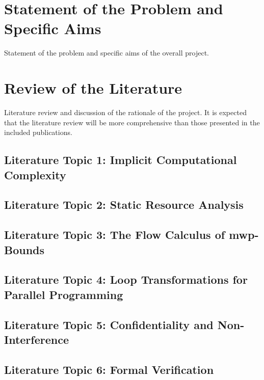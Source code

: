 \clearpage\section{Statement of the Problem and Specific Aims}\label{intro}

Statement of the problem and specific aims of the overall project.



\clearpage\section{Review of the Literature}\label{sec:pre}

Literature review and discussion of the rationale of the project.
It is expected that the literature review will be more comprehensive than
those presented in the included publications.

\subsection{Literature Topic 1: Implicit Computational Complexity}\label{icc}


\subsection{Literature Topic 2: Static Resource Analysis}\label{static-analysis}


\subsection{Literature Topic 3: The Flow Calculus of mwp-Bounds}\label{flow-calculus}


\subsection{Literature Topic 4: Loop Transformations for Parallel Programming}\label{transforms}


\subsection{Literature Topic 5: Confidentiality and Non-Interference}\label{pl-sec}


\subsection{Literature Topic 6: Formal Verification}\label{verification}
